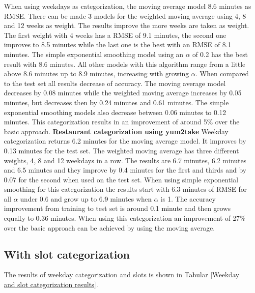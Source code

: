 When using weekdays as categorization, the moving average model 8.6 minutes as RMSE. There can be made 3 models for the weighted moving average using 4, 8 and 12 weeks as weight. The results improve the more weeks are taken as weight. The first weight with 4 weeks has a RMSE of 9.1 minutes, the second one improves to 8.5 minutes while the last one is the best with an RMSE of 8.1 minutes. The simple exponential smoothing model using an $\alpha$ of 0.2 has the best result with 8.6 minutes. All other models with this algorithm range from a little above 8.6 minutes up to 8.9 minutes, increasing with growing $\alpha$. When compared to the test set all results decrease of accuracy. The moving average model decreases by 0.08 minutes while the weighted moving average increases by 0.05 minutes, but decreases then by 0.24 minutes and 0.61 minutes. The simple exponential smoothing models also decrease between 0.06 minutes to 0.12 minutes.\newline
This categorization results in an improvement of around 5\% over the basic approach.
\newline\newline\textbf{Restaurant categorization using yum2take}\newline
Weekday categorization returns 6.2 minutes for the moving average model. It improves by 0.13 minutes for the test set. The weighted moving average has three different weights, 4, 8 and 12 weekdays in a row. The results are 6.7 minutes, 6.2 minutes and 6.5 minutes and they improve by 0.4 minutes for the first and thirds and by 0.07 for the second when used on the test set. When using simple exponential smoothing for this categorization the results start with 6.3 minutes of RMSE for all $\alpha$ under 0.6 and grow up to 6.9 minutes when $\alpha$ is 1. The accuracy improvement from training to test set is around 0.1 minute and then grows equally to 0.36 minutes.\newline
When using this categorization an improvement of 27\% over the basic approach can be achieved by using the moving average.
\subsection{With slot categorization}
The results of weekday categorization and slots is shown in Tabular \ref{Weekday and slot categorization results}.

